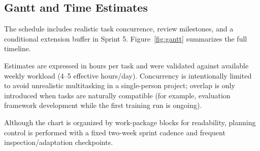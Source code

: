 \documentclass[11pt, a4paper]{article}
\begin{document}
\subsection{Gantt and Time Estimates}
The schedule includes realistic task concurrence, review milestones, and a conditional extension buffer in Sprint 5. Figure~\ref{fig:gantt} summarizes the full timeline.

Estimates are expressed in hours per task and were validated against available weekly workload (4--5 effective hours/day). Concurrency is intentionally limited to avoid unrealistic multitasking in a single-person project; overlap is only introduced when tasks are naturally compatible (for example, evaluation framework development while the first training run is ongoing).

Although the chart is organized by work-package blocks for readability, planning control is performed with a fixed two-week sprint cadence and frequent inspection/adaptation checkpoints.
\end{document}
